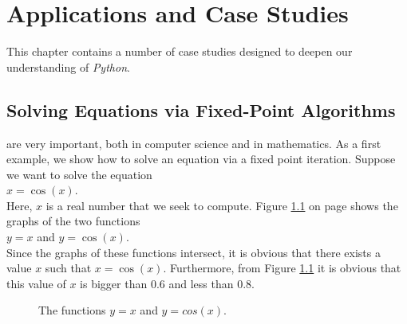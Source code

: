 \chapter{Applications and Case Studies}
This chapter contains a number of case studies designed to deepen our understanding of \textsl{Python}.

\section{Solving Equations via Fixed-Point Algorithms}
 are very important, both in computer science and in mathematics.  As a first
example, we show how to solve an equation via a fixed point iteration.  Suppose we want to solve the equation  
\\[0.2cm]
\hspace*{1.3cm} $x = \cos(x)$. \\[0.2cm]
Here, $x$ is a real number that we seek to compute.  Figure \ref{fig:xEqualsCosX.pdf} on page
\pageref{fig:xEqualsCosX.pdf} shows the graphs of the two functions  
\\[0.2cm]
\hspace*{1.3cm}
$y = x$  \quad and \quad $y = \cos(x)$.
\\[0.2cm]
Since the graphs of these functions intersect, it is obvious that there exists a value $x$ such that $x = \cos(x)$. 
Furthermore, from Figure \ref{fig:xEqualsCosX.pdf} it is obvious that this value of $x$ is bigger than $0.6$
and less than $0.8$. 

\begin{figure}[!ht]
  \hspace*{-3.0cm}

  \caption{The functions $y = x$ and $y = cos(x)$.}
  \label{fig:xEqualsCosX.pdf}
\end{figure}



